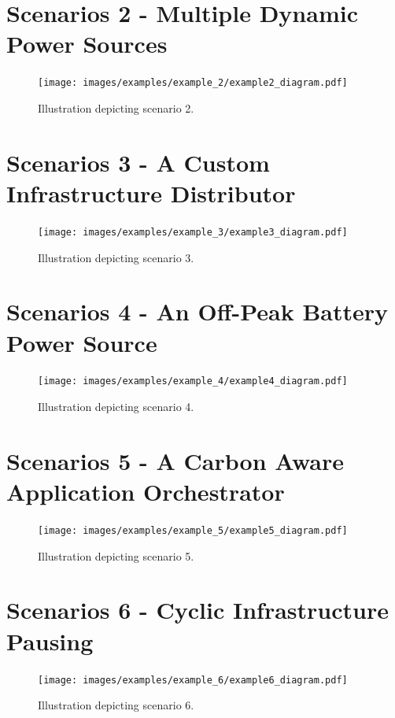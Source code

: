 \documentclass{l4proj}
\begin{document}
\section{Scenarios 2 - Multiple Dynamic Power Sources}\label{eval:subsec:scenario2}
\begin{figure}[h]
    \centering
    \texttt{[image: images/examples/example\_2/example2\_diagram.pdf]}
    ~
    \caption{Illustration depicting scenario 2.}
    \label{fig:example2_diagram}
\end{figure}

\section{Scenarios 3 - A Custom Infrastructure Distributor}\label{eval:subsec:scenario3}
\begin{figure}[h]
    \centering
    \texttt{[image: images/examples/example\_3/example3\_diagram.pdf]}
    ~
    \caption{Illustration depicting scenario 3.}
    \label{fig:example3_diagram}
\end{figure}

\section{Scenarios 4 - An Off-Peak Battery Power Source}\label{eval:subsec:scenario4}
\begin{figure}[h]
    \centering
    \texttt{[image: images/examples/example\_4/example4\_diagram.pdf]}
    ~
    \caption{Illustration depicting scenario 4.}
    \label{fig:example4_diagram}
\end{figure}

\section{Scenarios 5 - A Carbon Aware Application Orchestrator}\label{eval:subsec:scenario 5}
\begin{figure}[h]
    \centering
    \texttt{[image: images/examples/example\_5/example5\_diagram.pdf]}
    ~
    \caption{Illustration depicting scenario 5.}
    \label{fig:example5_diagram}
\end{figure}

\section{Scenarios 6 - Cyclic Infrastructure Pausing}\label{eval:subsec:scenario 6}
\begin{figure}[h]
    \centering
    \texttt{[image: images/examples/example\_6/example6\_diagram.pdf]}
    ~
    \caption{Illustration depicting scenario 6.}
    \label{fig:example6_diagram}
\end{figure}
\end{document}

